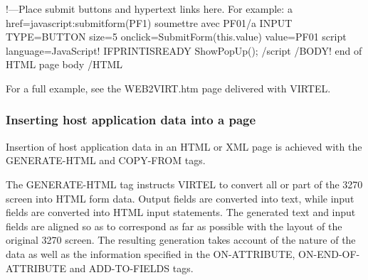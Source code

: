 \documentclass[letterpaper,10pt,english]{sphinxmanual}
\begin{document}
\begin{sphinxVerbatim}[commandchars=\\\{\}]
\PYGZlt{}!—\PYGZhy{}Place submit buttons and hypertext links here. For example:\PYGZhy{}\PYGZhy{}\PYGZgt{}
\PYGZlt{}a href=\PYGZdq{}javascript:submitform(\PYGZsq{}PF1\PYGZsq{})\PYGZdq{} \PYGZgt{}soumettre avec PF01\PYGZlt{}/a\PYGZgt{}
\PYGZlt{}INPUT TYPE=\PYGZdq{}BUTTON\PYGZdq{} size=\PYGZdq{}5\PYGZdq{} onclick=\PYGZdq{}SubmitForm(this.value)\PYGZdq{}    value=\PYGZdq{}PF01\PYGZdq{}\PYGZgt{}
\PYGZlt{}script language=\PYGZdq{}JavaScript\PYGZdq{}\PYGZgt{}\PYGZlt{}!\PYGZhy{}\PYGZhy{}    \PYGZob{}\PYGZob{}\PYGZob{}IF\PYGZhy{}PRINT\PYGZhy{}IS\PYGZhy{}READY
    ShowPopUp();
\PYGZcb{}\PYGZcb{}\PYGZcb{}
\PYGZhy{}\PYGZhy{}\PYGZgt{}\PYGZlt{}/script\PYGZgt{}
\PYGZlt{}/BODY\PYGZgt{}\PYGZlt{}!\PYGZhy{}\PYGZhy{}\PYGZhy{}\PYGZhy{}\PYGZhy{}\PYGZhy{}\PYGZhy{}\PYGZhy{}\PYGZhy{}\PYGZhy{}\PYGZhy{}\PYGZhy{}\PYGZhy{}\PYGZhy{}\PYGZhy{}\PYGZhy{}\PYGZhy{}\PYGZhy{} end of HTML page body    \PYGZhy{}\PYGZhy{}\PYGZhy{}\PYGZhy{}\PYGZhy{}\PYGZhy{}\PYGZhy{}\PYGZhy{}\PYGZhy{}\PYGZhy{}\PYGZhy{}\PYGZhy{}\PYGZhy{}\PYGZhy{}\PYGZhy{}\PYGZhy{}\PYGZhy{}\PYGZhy{}\PYGZhy{}\PYGZhy{}\PYGZgt{}
\PYGZlt{}/HTML\PYGZgt{}
\end{sphinxVerbatim}

For a full example, see the WEB2VIRT.htm page delivered with VIRTEL.


\subsubsection{Inserting host application data into a page}
\label{\detokenize{User_Guide:inserting-host-application-data-into-a-page}}\label{\detokenize{User_Guide:v457ug-inserting-host-data}}

Insertion of host application data in an HTML or XML page is achieved with the GENERATE-HTML and COPY-FROM tags.


The GENERATE-HTML tag instructs VIRTEL to convert all or part of the 3270 screen into HTML form data. Output fields are converted into text, while input fields are converted into HTML input statements.     The generated text and input fields are aligned so as to correspond as far as possible with the layout of the original 3270 screen. The resulting generation takes account of the nature of the data as well     as the information specified in the ON-ATTRIBUTE, ON-END-OF-ATTRIBUTE and ADD-TO-FIELDS tags.
\end{document}
